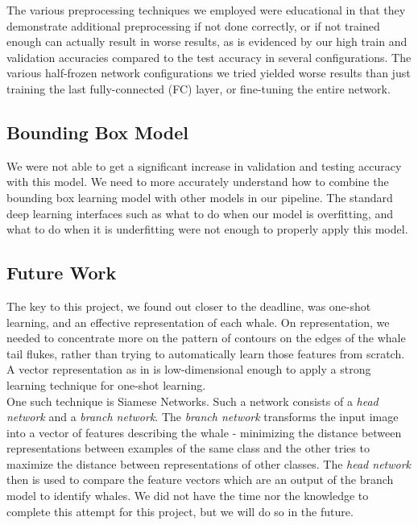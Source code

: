 The various preprocessing techniques we employed were educational in that they demonstrate additional preprocessing if not done correctly, or if not trained enough can actually result in worse results, as is evidenced by our high train and validation accuracies compared to the test accuracy in several configurations. The various half-frozen network configurations we tried yielded worse results than just training the last fully-connected (FC) layer, or fine-tuning the entire network.

\subsection{Bounding Box Model}

We were not able to get a significant increase in validation and testing accuracy with this model. We need to more accurately understand how to combine the bounding box learning model with other models in our pipeline. The standard deep learning interfaces such as what to do when our model is overfitting, and what to do when it is underfitting were not enough to properly apply this model. 

\subsection{Future Work}

The key to this project, we found out closer to the deadline, was one-shot learning, and an effective representation of each whale. On representation, we needed to concentrate more on the pattern of contours on the edges of the whale tail flukes, rather than trying to automatically learn those features from scratch. A vector representation as in \cite{weideman2017integral} is low-dimensional enough to apply a strong learning technique for one-shot learning.\\

One such technique is Siamese Networks. Such a network consists of a \textit{head network} and a \textit{branch network}. The \textit{branch network} transforms the input image into a vector of features describing the whale - minimizing the distance between representations between examples of the same class and the other tries to maximize the distance between representations of other classes. The \textit{head network} then is used to compare the feature vectors which are an output of the branch model to identify whales. We did not have the time nor the knowledge to complete this attempt for this project, but we will do so in the future.